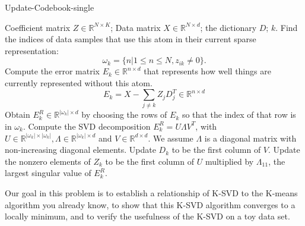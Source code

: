 \begin{algorithm}[H] 
   \caption{Update-Codebook-single}
   \label{alg:ucs}
   \begin{algorithmic}
     \Require Coefficient matrix $Z\in\mathbb R^{N\times K}$; Data matrix $X\in\mathbb R^{N\times d}$; the dictionary $D$; $k$.
        \State Find the indices of data samples that use this atom in  their current sparse representation: 
        $$\omega_k=\{n|1\leq n\leq N, z_{ik}\neq 0\}.$$
        \State Compute the error matrix $E_k\in \mathbb R^{n\times d}$ that represents how well things are currently represented without this atom.  
        $$E_k=X - \sum_{j\neq k}Z_jD_j^T\in\mathbb R^{n\times d}$$
        \State Obtain $E_k^R\in\mathbb R^{|\omega_k|\times d}$ by choosing the rows of $E_k$ so that the index of that row is in $\omega_k$.
        \State Compute the SVD decomposition $E_k^R = U\Lambda V^T$, with $U\in\mathbb R^{|\omega_k|\times |\omega_k|},\Lambda \in\mathbb R^{|\omega_k|\times d}$ and $V\in\mathbb R^{d\times d}$. We assume $\Lambda$ is a diagonal matrix with non-increasing diagonal elements.
        \State Update $D_k$ to be the first column of $V$.
        \State Update the nonzero elements of $Z_k$ to be the first column of $U$ multiplied by $\Lambda_{11}$, the largest singular value of $E_k^R$.
         
            \EndFunction
   \end{algorithmic}
 \end{algorithm}

Our goal in this problem is to establish a relationship of K-SVD to
the K-means algorithm you already know, to show that this K-SVD
algorithm converges to a locally minimum, and to verify the usefulness
of the K-SVD on a toy data set. 

